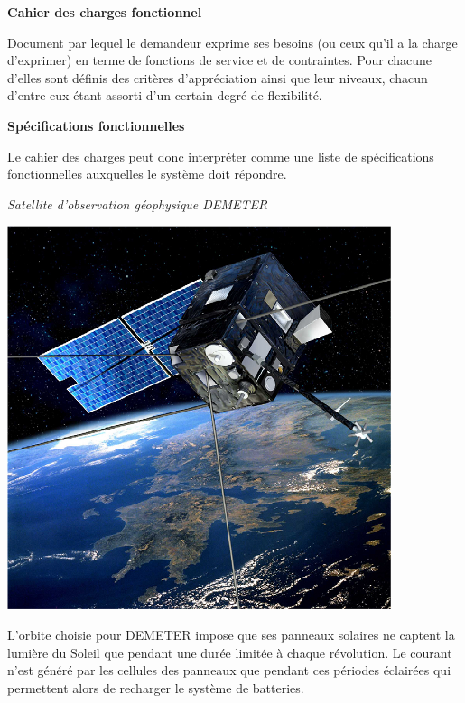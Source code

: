\documentclass[11pt,oneside]{article}
\begin{document}
\begin{defi}
\textbf{Cahier des charges fonctionnel} \cite{norme}

Document par lequel le demandeur exprime ses besoins (ou ceux qu'il a la charge d'exprimer) en terme de fonctions de service et de contraintes. Pour chacune d'elles sont définis des critères d'appréciation ainsi que leur niveaux, chacun d'entre eux étant assorti d'un certain degré de flexibilité.  

\textbf{Spécifications fonctionnelles}

Le cahier des charges peut donc interpréter comme une liste de spécifications fonctionnelles auxquelles le système doit répondre.

\end{defi}

\begin{exemple}
\textit{Satellite d'observation géophysique DEMETER}



\noindent\begin{minipage}[c]{.25\linewidth}
\begin{center}
\includegraphics[width=.9\textwidth]{png/demeter_p}
\end{center}
\end{minipage}\hfill
\begin{minipage}[c]{.7\linewidth}
L’orbite choisie pour DEMETER impose que ses panneaux solaires ne captent la lumière du Soleil que
pendant une durée limitée à chaque révolution. Le courant n’est généré par les cellules des panneaux que
pendant ces périodes éclairées qui permettent alors de recharger le système de batteries. 
\end{minipage}


\end{exemple}
\end{document}
